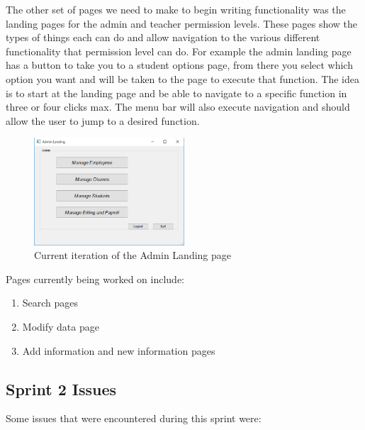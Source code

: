 The other set of pages we need to make to begin writing functionality was the landing pages for the admin and teacher permission levels. These pages show the types of things each can do and allow navigation to the various different functionality that permission level can do. For example the admin landing page has a button to take you to a student options page, from there you select which option you want and will be taken to the page to execute that function. The idea is to start at the landing page and be able to navigate to a specific function in three or four clicks max. The menu bar will also execute navigation and should allow the user to jump to a desired function.\\

\begin{figure}
\caption{Current iteration of the Admin Landing page}
\centering
\includegraphics[width=0.5\textwidth]{admin_landing}
\end{figure}

Pages currently being worked on include:

\begin{enumerate}
\item Search pages
\item Modify data page
\item Add information and new information pages
\end{enumerate}


\subsection{Sprint 2 Issues}
Some issues that were encountered during this sprint were:

